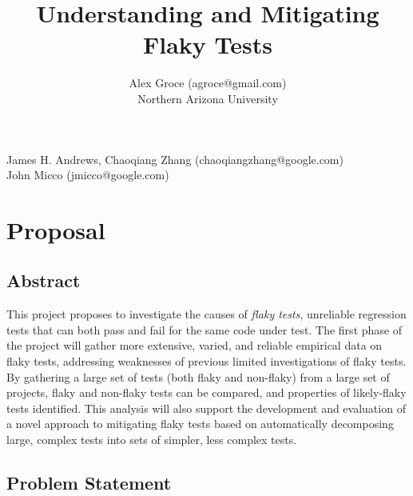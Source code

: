 \documentclass[10pt]{article}
\title{Understanding and Mitigating Flaky Tests}
\author{Alex Groce (agroce@gmail.com)\\Northern Arizona University}
\date{}
\begin{document}
\maketitle


 James H. Andrews, Chaoqiang Zhang (chaoqiangzhang@google.com) \\
 John Micco (jmicco@google.com)
\section{Proposal}

\subsection{Abstract}

This project proposes to investigate the causes of \emph{flaky tests}, unreliable regression tests that can both pass and fail for the same code under test.  The first phase of the project will gather more extensive, varied, and reliable empirical data on flaky tests, addressing weaknesses of previous limited investigations of flaky tests.  By gathering a large set of tests (both flaky and non-flaky) from a large set of projects, flaky and non-flaky tests can be compared, and properties of likely-flaky tests identified.  This analysis will also support the development and evaluation of a novel approach to mitigating flaky tests based on automatically decomposing large, complex tests into sets of simpler, less complex tests.

\subsection{Problem Statement}
\end{document}
